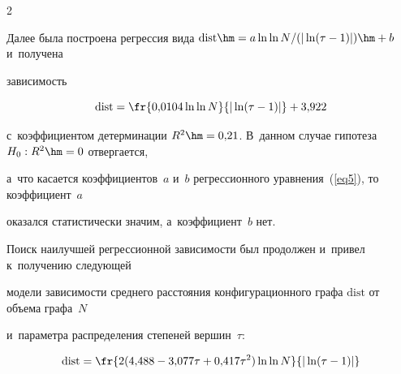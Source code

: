 \begin{multicols}{2}
\begin{figure}
\begin{minipage}[t]{80mm}
\begin{center}
{\epsfxsize=77.81mm


}

\end{center}

\vspace*{-9pt}


\end{minipage}

\vspace*{-4pt}

\end{figure}







Далее была построена регрессия вида $\mathrm{dist}\hm={a\ln\ln N}/({|\ln(\tau-1)|})\hm+b$ и~получена

за\-ви\-си\-мость

\begin{equation}

\label{eq5}

\mathrm{dist} = \fr{0{,}0104\ln\ln N}{|\ln(\tau-1)|}+3{,}922

\end{equation}

с~коэффициентом детерминации $R^2\hm=0{,}21$. В~данном случае гипотеза $H_0: R^2\hm=0$ отвергается,

а~что касается коэффициентов~$a$ и~$b$ регрессионного уравнения~(\ref{eq5}), то коэффициент~$a$

оказался статистически значим, а~коэффициент~$b$ нет.

Поиск наилучшей регрессионной за\-ви\-си\-мости был продолжен и~привел к~получению сле\-ду\-ющей

модели за\-ви\-си\-мости сред\-не\-го рас\-сто\-яния конфигурационного графа $\mathrm{dist}$ от объема графа~$N$ 

и~па\-ра\-мет\-ра распределения степеней вершин~$\tau$:

\begin{equation}\label{eq6}

\mathrm{dist} = \fr{2(4{,}488-3{,}077\tau+0{,}417\tau^2)\ln\ln N}{|\ln(\tau-1)|}


\end{equation}
\end{multicols}
